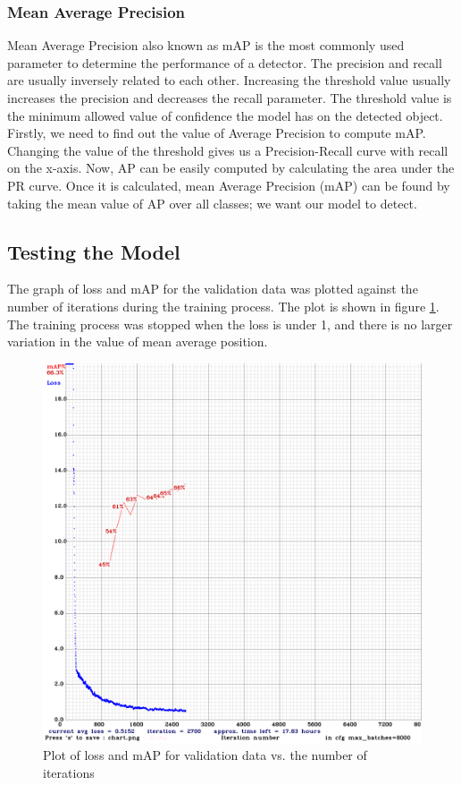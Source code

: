 \subsubsection*{Mean Average Precision}
Mean Average Precision also known as mAP is the most commonly used parameter to determine the
performance of a detector. The precision and recall are usually inversely related to each other. Increasing the threshold value usually increases the precision and decreases the recall parameter. The threshold value is the minimum allowed value of confidence the model has on the detected object. Firstly, we need to find out the value of Average Precision to compute mAP. Changing the value of the threshold gives us a Precision-Recall curve with recall on the x-axis. Now, AP can be easily computed by calculating the area under the PR curve. Once it is calculated, mean Average Precision (mAP) can be found by taking the mean value of AP over all classes; we want our model to detect.
\subsection{Testing the Model}
The graph of loss and mAP for the validation data was plotted against
the number of iterations during the training process. The plot is
shown in figure \ref{fig:5.9}. The training process was stopped when
the loss is under 1, and there is no larger variation in the value of
mean average position.
\begin{figure}
\centering
\captionsetup{justification = centering}
\includegraphics[scale= 0.25]{CHAPTERS/Chapter-5/images/5.9.PNG}
\caption{Plot of loss and mAP for validation data vs. the number of iterations}
\label{fig:5.9}
\end{figure}

